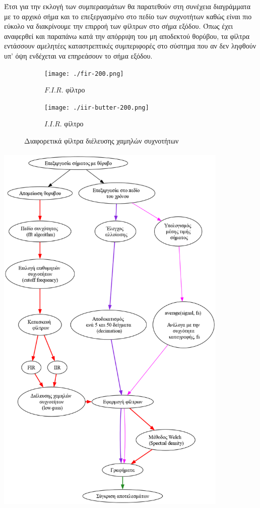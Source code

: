 \documentclass[breaklines=true, 12pt]{article}
\begin{document}
Έτσι για την εκλογή των συμπερασμάτων θα παρατεθούν στη συνέχεια διαγράμματα
με το αρχικό σήμα και το επεξεργασμένο στο πεδίο των συχνοτήτων καθώς είναι
πιο εύκολο να διακρίνουμε την επιρροή των φίλτρων στο σήμα εξόδου. Όπως έχει
αναφερθεί και παραπάνω κατά την απόρριψη του μη αποδεκτού θορύβου, τα φίλτρα
εντάσσουν αμελητέες καταστρεπτικές συμπεριφορές στο σύστημα που αν δεν ληφθούν
υπ' όψη ενδέχεται να επηρεάσουν το σήμα εξόδου.


\begin{figure}
\centering
\begin{subfigure}{.5\textwidth}
\centering
\texttt{[image: ./fir-200.png]}
\caption{\(F.I.R.\) φίλτρο}
\label{fig:sub1}
\end{subfigure}%
\begin{subfigure}{.5\textwidth}
\centering
\texttt{[image: ./iir-butter-200.png]}
\caption{\(I.I.R.\) φίλτρο}
\label{fig:sub2}
\end{subfigure}
\caption{Διαφορετικά φίλτρα διέλευσης χαμηλών συχνοτήτων}
\label{fig:test}
\end{figure}

\begin{center}
\includegraphics[width=420px,height=699px]{./flowcharts/proc-meth.png}
\end{center}
\clearpage
\end{document}
